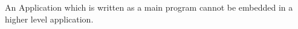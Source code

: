 %


An Application which is written as a main program cannot
be embedded in a higher level application.

